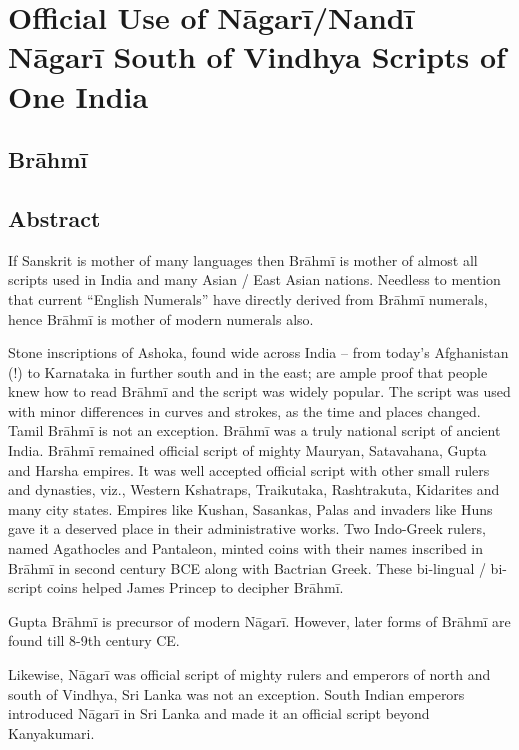 
\chapter{Official Use of Nāgarī/Nandī Nāgarī South of Vindhya Scripts of One India}



\section*{Brāhmī}


\section*{Abstract}

If Sanskrit is mother of many languages then Brāhmī is mother of almost all scripts used in India and many Asian / East Asian nations. Needless to mention that current “English Numerals” have directly derived from Brāhmī numerals, hence Brāhmī is mother of modern numerals also.

Stone inscriptions of Ashoka, found wide across India – from today’s Afghanistan (!) to Karnataka in further south and in the east; are ample proof that people knew how to read Brāhmī and the script was widely popular. The script was used with minor differences in curves and strokes, as the time and places changed. Tamil Brāhmī is not an exception. Brāhmī was a truly national script of ancient India. Brāhmī remained official script of mighty Mauryan, Satavahana, Gupta and Harsha empires. It was well accepted official script with other small rulers and dynasties, viz., Western Kshatraps, Traikutaka, Rashtrakuta, Kidarites and many city states. Empires like Kushan, Sasankas, Palas and invaders like Huns gave it a deserved place in their administrative works. Two Indo-Greek rulers, named Agathocles and Pantaleon, minted coins with their names inscribed in Brāhmī in second century BCE along with Bactrian Greek. These bi-lingual / bi-script coins helped James Princep to decipher Brāhmī.

Gupta Brāhmī is precursor of modern Nāgarī. However, later forms of Brāhmī are found till 8-9th century CE.

Likewise, Nāgarī was official script of mighty rulers and emperors of north and south of Vindhya, Sri Lanka was not an exception. South Indian emperors introduced Nāgarī in Sri Lanka and made it an official script beyond Kanyakumari.

